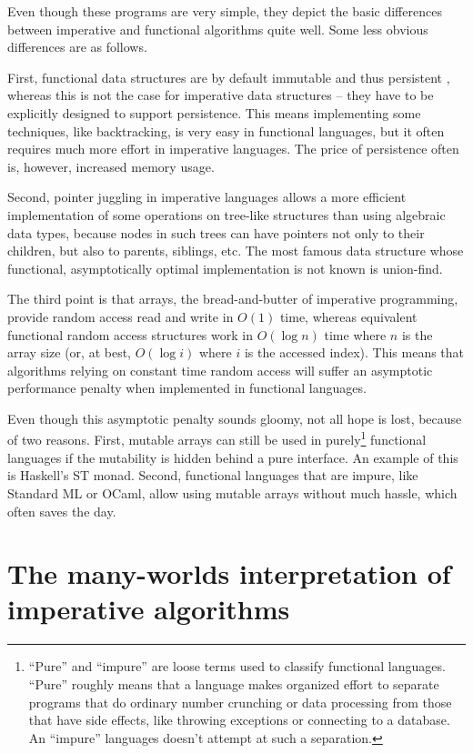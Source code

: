 \documentclass[declaration,mgr,english,shortabstract]{iithesis}
\begin{document}
Even though these programs are very simple, they depict the basic differences between imperative and functional algorithms quite well. Some less obvious differences are as follows.

First, functional data structures are by default immutable and thus persistent \cite{PersistentDataStructures}, whereas this is not the case for imperative data structures -- they have to be explicitly designed to support persistence. This means implementing some techniques, like backtracking, is very easy in functional languages, but it often requires much more effort in imperative languages. The price of persistence often is, however, increased memory usage.

Second, pointer juggling in imperative languages allows a more efficient implementation of some operations on tree-like structures than using algebraic data types, because nodes in such trees can have pointers not only to their children, but also to parents, siblings, etc. The most famous data structure whose functional, asymptotically optimal implementation is not known is union-find. \cite{FunctionalUnionFind}

The third point is that arrays, the bread-and-butter of imperative programming, provide random access read and write in $O(1)$ time, whereas equivalent functional random access structures work in $O(\log n)$ time where $n$ is the array size (or, at best, $O(\log i)$ where $i$ is the accessed index). This means that algorithms relying on constant time random access will suffer an asymptotic performance penalty when implemented in functional languages. \cite{Pippenger}

Even though this asymptotic penalty sounds gloomy, not all hope is lost, because of two reasons. First, mutable arrays can still be used in purely\footnote{``Pure'' and ``impure'' are loose terms used to classify functional languages. ``Pure'' roughly means that a language makes organized effort to separate programs that do ordinary number crunching or data processing from those that have side effects, like throwing exceptions or connecting to a database. An ``impure'' languages doesn't attempt at such a separation.} functional languages if the mutability is hidden behind a pure interface. An example of this is Haskell's ST monad. \cite{STMonad} Second, functional languages that are impure, like Standard ML or OCaml, allow using mutable arrays without much hassle, which often saves the day.

\section{The many-worlds interpretation of imperative algorithms} \label{worlds}
\end{document}
